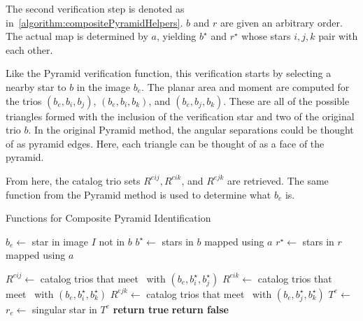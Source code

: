 The second verification step is denoted as 
in~\autoref{algorithm:compositePyramidHelpers}.
$b$ and $r$ are given an arbitrary order.
The actual map is determined by $a$, yielding $b^{\star}$ and $r^{\star}$ whose stars $i, j, k$ pair with each other.

Like the Pyramid verification function, this verification starts by selecting a nearby star to $b$ in the image $b_e$.
The planar area and moment are computed for the trios $(b_e, b_i, b_j)$, $(b_e, b_i, b_k)$, and $(b_e, b_j, b_k)$.
These are all of the possible triangles formed with the inclusion of the verification star and two of the original
trio $b$.
In the original Pyramid method, the angular separations could be thought of as pyramid edges.
Here, each triangle can be thought of as a face of the pyramid.

From here, the catalog trio sets $R^{eij}, R^{eik}$, and $R^{ejk}$ are retrieved.
The same function  from the Pyramid method is used to determine what $b_e$ is.
\begin{algorithm}
    \caption{Functions for Composite Pyramid Identification} \label{algorithm:compositePyramidHelpers}
    \begin{algorithmic}[1]
        \State $b_e \gets $ star in image $I$ not in $b$
        \State $b^{\star} \gets $ stars in $b$ mapped using $a$
        \State $r^{\star} \gets $ stars in $r$ mapped using $a$

        \State $R^{eij} \gets $ catalog trios that meet~ with $(b_e, b^{\star}_i,
        b^{\star}_j)$
        \State $R^{eik} \gets $ catalog trios that meet~ with $(b_e, b^{\star}_i,
        b^{\star}_k)$
        \State $R^{ejk} \gets $ catalog trios that meet~ with $(b_e, b^{\star}_j,
        b^{\star}_k)$
        \State $T^e \gets $ 
        \\
        \State $r_e \gets $ singular star in $T^e$
        \State \textbf{return true}
        \EndIf
        \EndIf
        \State \textbf{return false}
        \EndFunction
    \end{algorithmic}
\end{algorithm}

\begin{table*}[ht]
\end{table*}